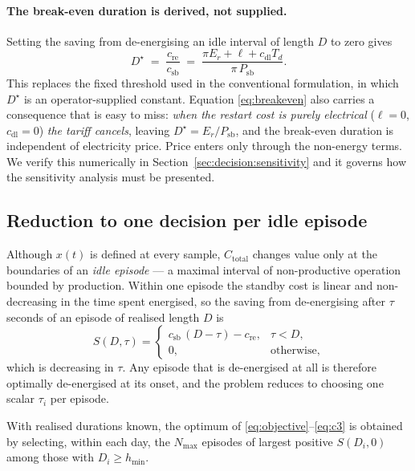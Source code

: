 \paragraph{The break-even duration is derived, not supplied.}
Setting the saving from de-energising an idle interval of length $D$ to
zero gives
\begin{equation}
\label{eq:breakeven}
D^{\star} \;=\; \frac{c_{\text{re}}}{c_{\text{sb}}}
\;=\; \frac{\pi E_{r} + \ell + c_{\text{dl}} T_{d}}{\pi\,P_{\text{sb}}} .
\end{equation}
This replaces the fixed threshold used in the conventional formulation,
in which $D^{\star}$ is an operator-supplied constant. Equation
\eqref{eq:breakeven} also carries a consequence that is easy to miss:
\emph{when the restart cost is purely electrical} ($\ell = 0$,
$c_{\text{dl}} = 0$) \emph{the tariff cancels}, leaving
$D^{\star} = E_{r}/P_{\text{sb}}$, and the break-even duration is
independent of electricity price. Price enters only through the
non-energy terms. We verify this numerically in
Section~\ref{sec:decision:sensitivity} and it governs how the
sensitivity analysis must be presented.

\subsection{Reduction to one decision per idle episode}
\label{sec:decision:reduction}

Although $x(t)$ is defined at every sample, $C_{\text{total}}$ changes
value only at the boundaries of an \emph{idle episode} --- a maximal
interval of non-productive operation bounded by production. Within one
episode the standby cost is linear and non-decreasing in the time spent
energised, so the saving from de-energising after $\tau$ seconds of an
episode of realised length $D$ is
\begin{equation}
\label{eq:epsave}
S(D,\tau) =
\begin{cases}
c_{\text{sb}}\,(D-\tau) - c_{\text{re}}, & \tau < D,\\
0, & \text{otherwise,}
\end{cases}
\end{equation}
which is decreasing in $\tau$. Any episode that is de-energised at all
is therefore optimally de-energised at its onset, and the problem
reduces to choosing one scalar $\tau_i$ per episode.

\begin{proposition}
\label{prop:oracle}
With realised durations known, the optimum of
\eqref{eq:objective}--\eqref{eq:c3} is obtained by selecting, within
each day, the $N_{\max}$ episodes of largest positive $S(D_i,0)$ among
those with $D_i \ge h_{\min}$.
\end{proposition}

